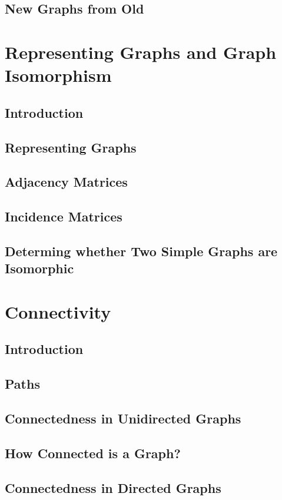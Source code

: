 \documentclass[11pt]{book}
\begin{document}
  \subsection{New Graphs from Old}
  
 \section{Representing Graphs and Graph Isomorphism}
  \subsection{Introduction}
  \subsection{Representing Graphs}
  \subsection{Adjacency Matrices}
  \subsection{Incidence Matrices}
  \subsection{Determing whether Two Simple Graphs are Isomorphic}
  
 \section{Connectivity}
  \subsection{Introduction}
  \subsection{Paths}
  \subsection{Connectedness in Unidirected Graphs}
  \subsection{How Connected is a Graph?}
  \subsection{Connectedness in Directed Graphs}
\end{document}
